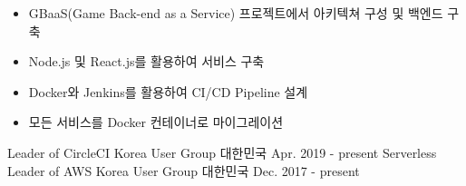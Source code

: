 \documentclass[10pt,a4paper,ragged2e]{altacv}
\begin{document}
\divider

\begin{itemize}
    \item {GBaaS(Game Back-end as a Service) 프로젝트에서 아키텍쳐 구성 및 백엔드 구축}
    \smallskip
    \item {Node.js 및 React.js를 활용하여 서비스 구축}
    \smallskip
    \item {Docker와 Jenkins를 활용하여 CI/CD Pipeline 설계}
    \smallskip
    \item {모든 서비스를 Docker 컨테이너로 마이그레이션}
\end{itemize}


    \smallskip
    \cvevent
        {Leader of CircleCI Korea User Group}
        {대한민국}
        {Apr. 2019 - present}
        {}
        {}
    \cvevent
        {Serverless Leader of AWS Korea User Group}
        {대한민국}
        {Dec. 2017 - present}
        {}
        {}





\end{document}
